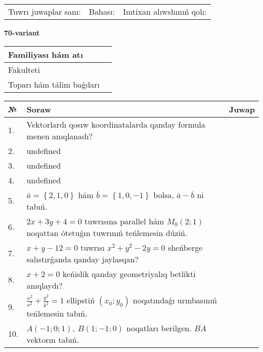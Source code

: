 \documentclass{article}
\begin{document}
\vspace{0.7cm}

\begin{tabular}{lll}
Tuwrı juwaplar sanı: \underline{\hspace{1cm}} & 
Bahası: \underline{\hspace{1cm}} & 
Imtixan alıwshınıń qolı: \underline{\hspace{2cm}} \\
\end{tabular}

\egroup

\newpage


\textbf{70-variant}\\

\bgroup
\def\arraystretch{1.6} %

\begin{tabular}{|m{5.7cm}|m{9.5cm}|}
\hline
Familiyası hám atı & \\
\hline
Fakulteti  & \\
\hline
Toparı hám tálim baǵdarı  & \\
\hline
\end{tabular}

\vspace{0.7cm}

\begin{tabular}{|m{0.7cm}|m{10cm}|m{4cm}|}
\hline
№ & Soraw & Juwap \\
\hline
1. & Vektorlardı qosıw koordinatalarda qanday formula menen anıqlanadı? &  \\
\hline
2. & undefined &  \\
\hline
3. & undefined &  \\
\hline
4. & undefined &  \\
\hline
5. & \(\bar{a} = \left\{ 2, 1, 0 \right\}\) hám \(\bar{b} = \left\{ 1, 0,- 1 \right\}\) bolsa, \(\bar{a} - \bar{b}\) ni tabıń. &  \\
\hline
6. & \(2 x + 3 y + 4 = 0\) tuwrısına parallel hám \(M_{0} (2;1)\) noqattan ótetuǵın tuwrınıń teńlemesin dúziń. &  \\
\hline
7. & \(x + y - 12 = 0\) tuwrısı \(x^{2} + y^{2} - 2 y = 0\) sheńberge salıstırǵanda qanday jaylasqan? &  \\
\hline
8. & \(x + 2 = 0\) keńislik qanday geometriyalıq betlikti anıqlaydı? &  \\
\hline
9. & \(\frac{x^{2}}{a^{2}} + \frac{y^{2}}{b^{2}} = 1\) ellipstiń \((x_{0};y_{0})\) noqatındaǵı urınbasınıń teńlemesin tabıń. &  \\
\hline
10. & \(A (- 1;0;1),\ B (1; - 1;0)\) noqatları berilgen. \(\bar{BA}\) vektorın tabıń. & \\
\hline
\end{tabular}
\end{document}
